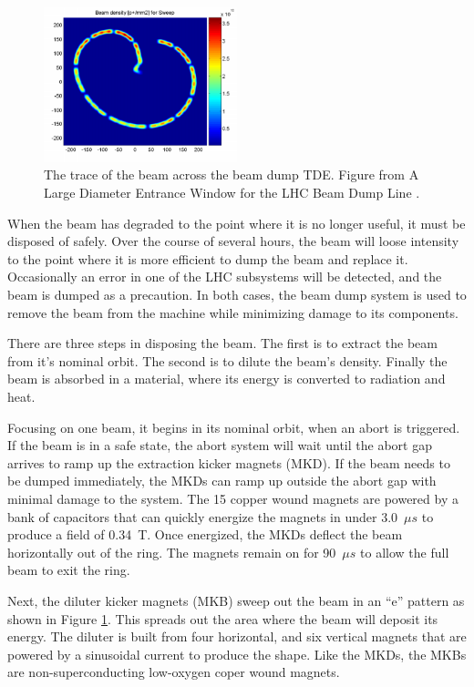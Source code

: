 \begin{figure}[h!]
\captionsetup[subfigure]{position=b}
\centering
\includegraphics[width=0.5\textwidth]{figures/experiment/beamdump.png}
\caption{The trace of the beam across the beam dump TDE. Figure from A Large Diameter Entrance Window for the LHC Beam Dump Line \cite{beamdump}.}
\label{fig:beamdump}
\end{figure}

When the beam has degraded to the point where it is no longer useful, it must be disposed of safely.
Over the course of several hours, the beam will loose intensity to the point where it is more efficient to dump the beam and replace it.
Occasionally an error in one of the LHC subsystems will be detected, and the beam is dumped as a precaution.
In both cases, the beam dump system is used to remove the beam from the machine while minimizing damage to its components.

There are three steps in disposing the beam. 
The first is to extract the beam from it's nominal orbit.
The second is to dilute the beam's density.
Finally the beam is absorbed in a material, where its energy is converted to radiation and heat. \cite{lhcDesignV1}

Focusing on one beam, it begins in its nominal orbit, when an abort is triggered. 
If the beam is in a safe state, the abort system will wait until the abort gap arrives to ramp up the extraction kicker magnets (MKD).
If the beam needs to be dumped immediately, the MKDs can ramp up outside the abort gap with minimal damage to the system.
The 15 copper wound magnets are powered by a bank of capacitors that can quickly energize the magnets in under 3.0~$\mu s$ to produce a field of 0.34~T. 
Once energized, the MKDs deflect the beam horizontally out of the ring.
The magnets remain on for 90~$\mu s$ to allow the full beam to exit the ring.

Next, the diluter kicker magnets (MKB) sweep out the beam in an ``e'' pattern as shown in Figure \ref{fig:beamdump}.
This spreads out the area where the beam will deposit its energy.
The diluter is built from four horizontal, and six vertical magnets that are powered by a sinusoidal current to produce the shape.
Like the MKDs, the MKBs are non-superconducting low-oxygen coper wound magnets.

